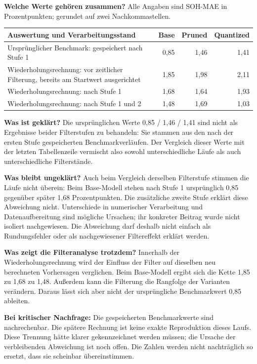 \documentclass[11pt,a4paper]{article}
\begin{document}
\textbf{Welche Werte gehören zusammen?} Alle Angaben sind SOH-MAE in Prozentpunkten; gerundet auf zwei Nachkommastellen.

\begin{center}\renewcommand{\arraystretch}{1.3}\begin{tabular}{|p{8.5cm}|r|r|r|}\hline \textbf{Auswertung und Verarbeitungsstand}&\textbf{Base}&\textbf{Pruned}&\textbf{Quantized}\\\hline Ursprünglicher Benchmark: gespeichert nach Stufe 1&0,85&1,46&1,41\\\hline Wiederholungsrechnung: vor zeitlicher Filterung, bereits am Startwert ausgerichtet&1,85&1,98&2,11\\\hline Wiederholungsrechnung: nach Stufe 1&1,68&1,64&1,93\\\hline Wiederholungsrechnung: nach Stufe 1 und 2&1,48&1,69&1,03\\\hline\end{tabular}\end{center}
\textbf{Was ist geklärt?} Die ursprünglichen Werte 0,85 /\allowbreak{} 1,46 /\allowbreak{} 1,41 sind nicht als Ergebnisse beider Filterstufen zu behandeln: Sie stammen aus den nach der ersten Stufe gespeicherten Benchmarkverläufen. Der Vergleich dieser Werte mit der letzten Tabellenzeile vermischt also sowohl unterschiedliche Läufe als auch unterschiedliche Filterstände.

\textbf{Was bleibt ungeklärt?} Auch beim Vergleich derselben Filterstufe stimmen die Läufe nicht überein: Beim Base-Modell stehen nach Stufe 1 ursprünglich 0,85 gegenüber später 1,68 Prozentpunkten. Die zusätzliche zweite Stufe erklärt diese Abweichung nicht. Unterschiede in numerischer Verarbeitung und Datenaufbereitung sind mögliche Ursachen; ihr konkreter Beitrag wurde nicht isoliert nachgewiesen. Die Abweichung darf deshalb nicht einfach als Rundungsfehler oder als nachgewiesener Filtereffekt erklärt werden.

\textbf{Was zeigt die Filteranalyse trotzdem?} Innerhalb der Wiederholungsrechnung wird der Einfluss der Filter auf dieselben neu berechneten Vorhersagen verglichen. Beim Base-Modell ergibt sich die Kette 1,85 zu 1,68 zu 1,48. Außerdem kann die Filterung die Rangfolge der Varianten verändern. Daraus lässt sich aber nicht der ursprüngliche Benchmarkwert 0,85 ableiten.

\textbf{Bei kritischer Nachfrage:} Die gespeicherten Benchmarkwerte sind nachrechenbar. Die spätere Rechnung ist keine exakte Reproduktion dieses Laufs. Diese Trennung hätte klarer gekennzeichnet werden müssen; die Ursache der verbleibenden Abweichung ist noch offen. Die Zahlen werden nicht nachträglich so ersetzt, dass sie scheinbar übereinstimmen.
\end{document}
